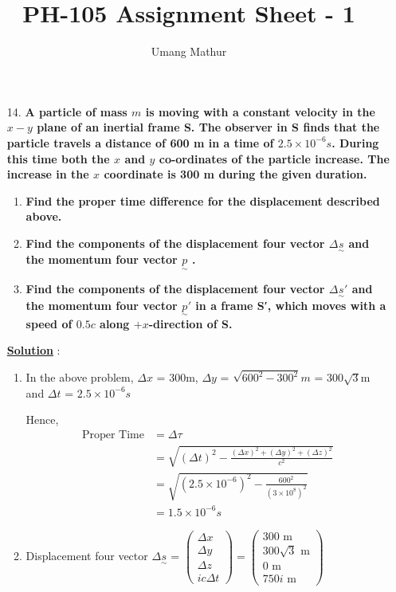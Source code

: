 \documentclass[10pt, a4paper]{article}
\begin{document}
\title{PH-105 Assignment Sheet - 1}
\date{}
\author{Umang Mathur}
\maketitle
\begin{enumerate}
\item[14.] {\bf A particle of mass $m$ is moving with a constant velocity in the $x-y$ plane of an inertial frame S. The observer in S finds that the particle travels a distance of 600 m in a time of $2.5\times 10^{-6}s$. During this time both the $x$ and $y$ co-ordinates of the particle increase. The increase in the $x$ coordinate is 300 m during the given duration.}
\begin{enumerate}
\item {\bf Find the proper time difference for the displacement described above.}
\item {\bf Find the components of the displacement four vector $\Delta\underset{\sim}{s}$ and the momentum four vector $\underset{\sim}{p}$ .}
\item {\bf Find the components of the displacement four vector $\Delta\underset{\sim}{s}'$ and the momentum four vector $\underset{\sim}{p}'$ in a frame S′, which moves with a speed of $0.5c$ along $+x$-direction of S.}
\end{enumerate}

{\underline {\bf Solution}} :\\
\begin{enumerate}
\item In the above problem, $\Delta x$ = 300m, $\Delta y$ = $\sqrt{600^{2} - 300^{2}}m$ = 300$\sqrt{3}$m and $\Delta t$ = $2.5\times 10^{-6}s$

Hence, 
	\begin{align*}
		\mbox{Proper Time} &= \Delta \tau\\
		&= \sqrt{(\Delta t)^{2}-\frac{(\Delta x)^{2}+(\Delta y)^{2}+(\Delta z)^{2}}{c^{2}}}\\
		&= \sqrt{(2.5\times 10^{-6})^{2}-\frac{600^{2}}{(3\times 10^{8})^{2}}}\\
		&= 1.5\times 10^{-6}s
	\end{align*}
\item Displacement four vector $\Delta\underset{\sim}{s}$ = 
$\begin{pmatrix}
  \Delta x\\
  \Delta y\\
  \Delta z\\
  ic\Delta t
\end{pmatrix}
=
\begin{pmatrix}
  300 \mbox{ m}\\
  300\sqrt{3} \mbox{ m}\\
  0 \mbox{ m}\\
  750i \mbox{ m}
\end{pmatrix}$



\end{enumerate}
\end{enumerate}
\end{document}

